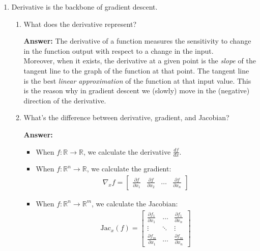 \documentclass{article}
\newenvironment{QandA}{\begin{enumerate}[label=\arabic*.]}{\end{enumerate}}
\newenvironment{InnerQandA}{\begin{enumerate}[label=\roman*.]}{\end{enumerate}}
\newenvironment{answer}{\par\normalfont \textbf{Answer:}}{}
\newcommand{\R}{\mathbb{R}}
\newcommand{\Jac}{\text{Jac}}
\begin{document}
\begin{QandA}
    \item Derivative is the backbone of gradient descent.
    \begin{InnerQandA}
        \item What does the derivative represent?
        \begin{answer}
            The derivative of a function measures the sensitivity to change in the function output with respect to a change in the input. \\
            Moreover, when it exists, the derivative at a given point is the \textit{slope} of the tangent line to the graph of the function at that point. The tangent line is the best \textit{linear approximation} of the function at that input value. This is the reason why in gradient descent we (slowly) move in the (negative) direction of the derivative. 
        \end{answer}
        \item What’s the difference between derivative, gradient, and Jacobian?
        \begin{answer}
            \begin{itemize}
                \item When $f: \R \rightarrow \R$, we calculate the derivative $\frac{df}{dx}$.
                \item When $f: \R^n \rightarrow \R$, we calculate the gradient:
                \begin{align*}
                    \nabla_x f = 
                    \begin{bmatrix}
                     \frac{\partial f}{ \partial x_1} & \frac{\partial f}{ \partial x_2} & \ldots  & \frac{\partial f}{ \partial x_n}
                    \end{bmatrix}
                \end{align*}
                \item When $f: \R^n \rightarrow \R^m$, we calculate the Jacobian:
                \begin{align*}
                    \Jac_x(f) = 
                    \begin{bmatrix}
                     \frac{\partial f_1}{ \partial x_1} & \ldots & \frac{\partial f_1}{ \partial x_n} \\
                     \vdots & \ddots & \vdots \\
                     \frac{\partial f_m}{ \partial x_1} & \ldots & \frac{\partial f_m}{ \partial x_n}
                    \end{bmatrix}
                \end{align*}
            \end{itemize}
        \end{answer}
    \end{InnerQandA}
    

\end{QandA}
\end{document}
